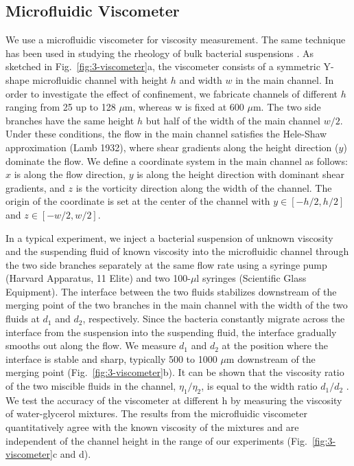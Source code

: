 \subsection{Microfluidic Viscometer}
We use a microfluidic viscometer for viscosity measurement. The same technique has been used in studying the rheology of bulk bacterial suspensions \cite{Gachelin2013}. As sketched
in Fig.~\ref{fig:3-viscometer}a, the viscometer consists of a symmetric Y-shape microfluidic channel with height $h$ and width $w$ in the main channel. In order to investigate the effect of confinement, we
fabricate channels of different $h$ ranging from 25 up to 128 $\mu$m, whereas w is fixed at 600 $\mu$m. The two side branches have the same height $h$ but half of the width of the main
channel $w/2$. Under these conditions, the flow in the main channel satisfies the Hele-Shaw approximation (Lamb 1932), where shear gradients along the height direction ($y$) dominate the flow. We define a coordinate system in the main channel as follows: $x$ is along the flow direction, $y$ is along the height direction with dominant shear gradients, and $z$ is the vorticity direction along the width of the channel.
The origin of the coordinate is set at the center of the channel with $y \in [-h/2, h/2]$ and $z \in [-w/2, w/2]$.

In a typical experiment, we inject a bacterial suspension of unknown viscosity and the suspending fluid of known viscosity into the microfluidic channel through the two side branches separately at the same flow rate using a syringe pump (Harvard Apparatus, 11 Elite) and two 100-$\mu$l syringes (Scientific Glass Equipment). The interface between the two fluids stabilizes downstream of the merging point of the two branches in the main channel with the width of the two fluids at $d_1$ and $d_2$, respectively.
Since the bacteria constantly migrate across the interface from the suspension into the suspending fluid, the interface gradually smooths out along the flow. We measure $d_1$ and $d_2$ at the position where the interface is stable and sharp, typically 500 to 1000 $\mu$m downstream of the merging point (Fig.~\ref{fig:3-viscometer}b).
It can be shown that the viscosity ratio of the two miscible fluids in the channel, $\eta_1/\eta_2$, is equal to the width ratio $d_1/d_2$ \cite{Guillot2006, Nghe2010}. We test the accuracy of the viscometer at different h by measuring the viscosity of water-glycerol mixtures.
The results from the microfluidic viscometer quantitatively agree with the known viscosity of the mixtures and are independent of the channel height in the range of our experiments (Fig.~\ref{fig:3-viscometer}c and d).

